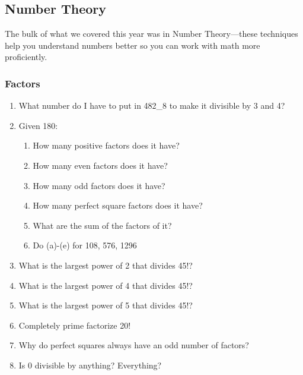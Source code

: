	\subsection{Number Theory}
		 The bulk of what we covered this year was in Number Theory---these techniques help you understand numbers better so you can work with math more proficiently.
		\subsubsection{Factors}
			\begin{enumerate}
				\item What number do I have to put in 482\_8 to make it divisible by 3 and 4?
				\item Given 180:
				\begin{enumerate}
					\item How many positive factors does it have?
					\item How many even factors does it have?
					\item How many odd factors does it have?
					\item How many perfect square factors does it have?
					\item What are the sum of the factors of it?
					\item Do (a)-(e) for 108, 576, 1296
				\end{enumerate}
				\item What is the largest power of 2 that divides 45!?
				\item What is the largest power of 4 that divides 45!?
				\item What is the largest power of 5 that divides 45!?
				\item Completely prime factorize 20!
				\item Why do perfect squares always have an odd number of factors?
				\item Is 0 divisible by anything? Everything?
			\end{enumerate}
